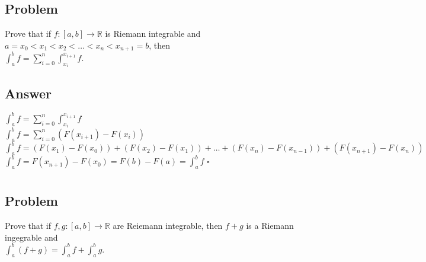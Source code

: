 \documentclass{article}
\newcommand\tab[1][1cm]{\hspace*{#1}}
\begin{document}
\subsection*{Problem}
Prove that if \(f:[a,b] \to \mathbb{R}\) is Riemann integrable and
\(a = x_{0} < x_{1} < x_{2} < \dots < x_{n} < x_{n+1} = b\), then \\
\tab[4cm] \(\int_{a}^{b}f = \sum\limits^{n}_{i=0}\int^{x_{i+1}}_{x_{i}}f\).

\subsection*{Answer}
\(\int_{a}^{b}f = \sum\limits^{n}_{i=0}\int^{x_{i+1}}_{x_{i}}f\) \\
\(\int_{a}^{b}f = \sum\limits^{n}_{i=0}(F(x_{i+1}) - F(x_{i}))\) \\
\(\int_{a}^{b}f = (F(x_{1}) - F(x_{0})) + (F(x_{2}) - F(x_{1})) + \dots +
(F(x_{n}) - F(x_{n-1})) + (F(x_{n+1}) - F(x_{n})) \) \\
\(\int_{a}^{b}f = F(x_{n+1}) - F(x_{0}) = F(b) - F(a) = \int_{a}^{b}f\)
\tab \(\square\)

\section{}

\subsection*{Problem}
Prove that if \(f, g: [a,b] \to \mathbb{R}\) are Reiemann integrable, then 
\(f+g\) is a Riemann ingegrable and \\
\tab[4cm] \(\int^{b}_{a}(f+g) = \int^{b}_{a}f + \int^{b}_{a}g\).
\end{document}
